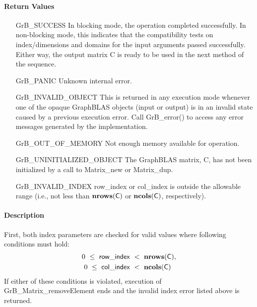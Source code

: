 \paragraph{Return Values}

\begin{itemize}[leftmargin=2.1in]
    \item[{\sf GrB\_SUCCESS}]         In blocking mode, the operation completed
    successfully. In non-blocking mode, this indicates that the compatibility 
    tests on index/dimensions and domains for the input arguments passed successfully. 
    Either way, the output matrix {\sf C} is ready to be used in the next method of 
    the sequence.

    \item[{\sf GrB\_PANIC}]   Unknown internal error.
    
    \item[{\sf GrB\_INVALID\_OBJECT}] This is returned in any execution mode 
    whenever one of the opaque GraphBLAS objects (input or output) is in an invalid 
    state caused by a previous execution error.  Call {\sf GrB\_error()} to access 
    any error messages generated by the implementation.

    \item[{\sf GrB\_OUT\_OF\_MEMORY}]  Not enough memory available for operation.
    
    \item[{\sf GrB\_UNINITIALIZED\_OBJECT}]  The GraphBLAS matrix, {\sf C}, has 
    not been initialized by a call to {\sf Matrix\_new} or {\sf Matrix\_dup}.

    \item[{\sf GrB\_INVALID\_INDEX}]  {\sf row\_index} or {\sf col\_index} is 
    outside the allowable range (i.e., not less than $\mathbf{nrows}({\sf C})$ or
    $\mathbf{ncols}({\sf C})$, respectively).
\end{itemize}

\paragraph{Description}

First, both index parameters are checked for valid values where following
conditions must hold:
\[
\begin{aligned}
    0\ \leq\ {\sf row\_index} & \ <\ \mathbf{nrows}({\sf C}), \\
    0\ \leq\ {\sf col\_index} & \ <\ \mathbf{ncols}({\sf C})
\end{aligned}
\]
If either of these conditions is violated, execution of 
{\sf GrB\_Matrix\_removeElement} ends and the invalid 
index error listed above is returned. 

